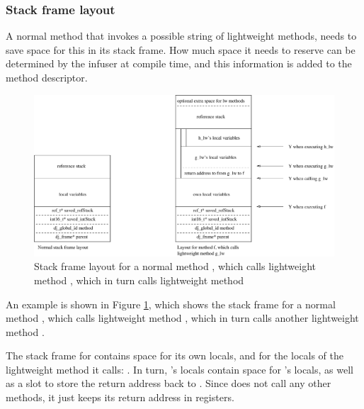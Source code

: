 \subsubsection{Stack frame layout}
A normal method that invokes a possible string of lightweight methods, needs to save space for this in its stack frame. How much space it needs to reserve can be determined by the infuser at compile time, and this information is added to the method descriptor.


\begin{figure}
\centering
\includegraphics[width=0.95\linewidth]{stack-frame-lightweight-method.eps}
\caption{Stack frame layout for a normal method , which calls lightweight method , which in turn calls lightweight method }
\label{fig-stack-frame-lightweight-method}
\end{figure}

An example is shown in Figure \ref{fig-stack-frame-lightweight-method}, which shows the stack frame for a normal method , which calls lightweight method , which in turn calls another lightweight method .

The stack frame for  contains space for its own locals, and for the locals of the lightweight method it calls: . In turn, 's locals contain space for 's locals, as well as a slot to store the return address back to . Since  does not call any other methods, it just keeps its return address in registers.

